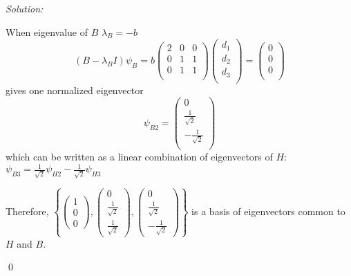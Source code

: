 \documentclass[12pt,a4paper]{article}
\newenvironment{sol}
    {\emph{Solution:}
    }
    {
    \qed
    }
\begin{document}
\begin{sol}
\begin{itemize}
When eigenvalue of $B$ $\lambda_B=-b$
\begin{equation}
(B-\lambda_BI)\psi_B=b\left(\begin{array}{ccc}
2&0&0\\
0&1&1\\
0&1&1\\
\end{array}\right)\left(\begin{array}{c}
d_1\\
d_2\\
d_3\\
\end{array}\right)=\left(\begin{array}{c}
0\\
0\\
0\\
\end{array}\right)
\end{equation}
gives one normalized eigenvector
\begin{equation}
\psi_{B2}=\left(\begin{array}{c}
0\\
\frac{1}{\sqrt{2}}\\
-\frac{1}{\sqrt{2}}\\
\end{array}\right)
\end{equation}
which can be written as a linear combination of eigenvectors of $H$: $\psi_{B3}=\frac{1}{\sqrt{2}}\psi_{H2}-\frac{1}{\sqrt{2}}\psi_{H3}$

Therefore, $\left\{\left(\begin{array}{c}1\\0\\0\end{array}\right),\left(\begin{array}{c}0\\\frac{1}{\sqrt{2}}\\\frac{1}{\sqrt{2}}\end{array}\right),\left(\begin{array}{c}0\\\frac{1}{\sqrt{2}}\\-\frac{1}{\sqrt{2}}\end{array}\right)\right\}$ is a basis of eigenvectors common to $H$ and $B$.
\end{itemize}
\end{sol}
\end{document}
